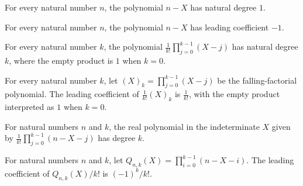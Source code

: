 \begin{theorem}
\label{FABL.complementLinear_natDegree}
\leanok
{}
For every natural number $n$, the polynomial $n-X$ has natural degree $1$.
\end{theorem}

\begin{theorem}
\label{FABL.complementLinear_leadingCoeff}
\leanok
{}
For every natural number $n$, the polynomial $n-X$ has leading coefficient $-1$.
\end{theorem}

\begin{theorem}
\label{FABL.chooseFactor_natDegree}
\leanok
{}
For every natural number $k$, the polynomial $\frac{1}{k!}\prod_{j=0}^{k-1}(X-j)$ has
natural degree $k$, where the empty product is $1$ when $k=0$.
\end{theorem}

\begin{theorem}
\label{FABL.chooseFactor_leadingCoeff}
\leanok
{}
For every natural number $k$, let $(X)_k=\prod_{j=0}^{k-1}(X-j)$ be the falling-factorial polynomial. The leading coefficient of
$\frac{1}{k!}(X)_{k}$ is $\frac{1}{k!}$, with the empty product interpreted as $1$ when
$k=0$.
\end{theorem}

\begin{theorem}
\label{FABL.complementChooseFactor_natDegree}
\leanok
{}
For natural numbers $n$ and $k$, the real polynomial in the indeterminate $X$ given by
$\frac{1}{k!}\prod_{j=0}^{k-1}(n-X-j)$ has degree $k$.
\end{theorem}

\begin{theorem}
\label{FABL.complementChooseFactor_leadingCoeff}
\leanok
{}
For natural numbers $n$ and $k$, let $Q_{n,k}(X)=\prod_{i=0}^{k-1}(n-X-i)$. The leading
coefficient of $Q_{n,k}(X)/k!$ is $(-1)^k/k!$.
\end{theorem}

